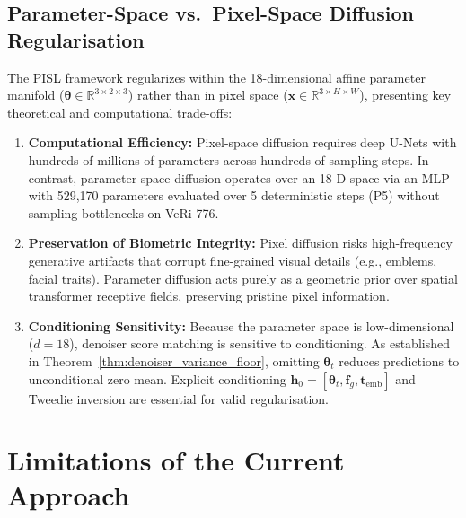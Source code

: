 \subsection{Parameter-Space vs.\ Pixel-Space Diffusion Regularisation}

The PISL framework regularizes within the 18-dimensional affine parameter manifold ($\boldsymbol{\theta} \in \mathbb{R}^{3 \times 2 \times 3}$) rather than in pixel space ($\mathbf{x} \in \mathbb{R}^{3 \times H \times W}$), presenting key theoretical and computational trade-offs:
\begin{enumerate}[itemsep=0.5pt,parsep=0pt,topsep=1pt]
    \item \textbf{Computational Efficiency:} Pixel-space diffusion \cite{ho2020denoising, song2020score} requires deep U-Nets with hundreds of millions of parameters across hundreds of sampling steps. In contrast, parameter-space diffusion operates over an 18-D space via an MLP with 529,170 parameters evaluated over 5 deterministic steps (P5) without sampling bottlenecks on VeRi-776.
    \item \textbf{Preservation of Biometric Integrity:} Pixel diffusion risks high-frequency generative artifacts that corrupt fine-grained visual details (e.g., emblems, facial traits). Parameter diffusion acts purely as a geometric prior over spatial transformer receptive fields, preserving pristine pixel information.
    \item \textbf{Conditioning Sensitivity:} Because the parameter space is low-dimensional ($d=18$), denoiser score matching is sensitive to conditioning. As established in Theorem~\ref{thm:denoiser_variance_floor}, omitting $\boldsymbol{\theta}_t$ reduces predictions to unconditional zero mean. Explicit conditioning $\mathbf{h}_0 = [\boldsymbol{\theta}_t, \mathbf{f}_g, \mathbf{t}_{\text{emb}}]$ and Tweedie inversion are essential for valid regularisation.
\end{enumerate}

\section{Limitations of the Current Approach}
\label{sec:limitations}

